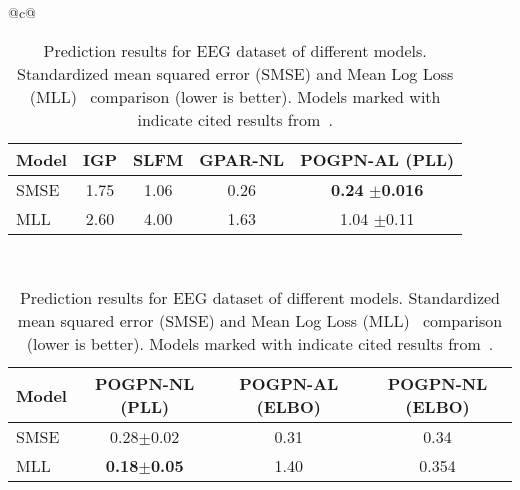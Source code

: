 \begin{table}[h]
      \setlength{\tabcolsep}{4pt}
      \centering
      \begin{tabular}{@{}c@{}}
            \begin{tabular}{@{\hskip 0pt}lcccc@{\hskip 0pt}}
                  \toprule
                  Model & IGP\textsuperscript{\textdagger} & SLFM\textsuperscript{\textdagger} & GPAR-NL\textsuperscript{\textdagger} & POGPN-AL (PLL) \\
                  \midrule
                  SMSE  &
                  1.75  &
                  1.06  &
                  0.26  &
                  \textbf{0.24}
                  $\pm$\textbf{0.016}
                  \\
                  MLL   &
                  2.60  & 4.00                             & 1.63                              & 1.04
                  $\pm$0.11
                  \\
                  \bottomrule
            \end{tabular}
            \\[2em] %

            \begin{tabular}{@{\hskip 0pt}lccc@{\hskip 0pt}}
                  \toprule
                  Model & POGPN-NL (PLL)                  & POGPN-AL (ELBO) & POGPN-NL (ELBO) \\
                  \midrule
                  SMSE  & 0.28$\pm$0.02                   & 0.31            & 0.34            \\
                  MLL   & \textbf{0.18}$\pm$\textbf{0.05} & 1.40            & 0.354           \\
                  \bottomrule
            \end{tabular}
      \end{tabular}
      \caption{Prediction results for EEG dataset of different models. Standardized mean squared error (SMSE) and Mean Log Loss (MLL)~\cite{rasmussen2003gaussian} comparison (lower is better). Models marked with \textsuperscript{\textdagger} indicate cited results from~\cite{requeima2019gaussian}.}\label{tb:eeg_results_extended}
\end{table}